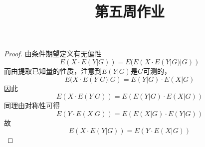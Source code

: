 \documentclass[cn]{homework}
\title{第五周作业}
\begin{document}
    \maketitle

    \problem
    \begin{proof}
        由条件期望定义有无偏性
        \[E(X\cdot E(Y|G))=E(E(X\cdot E(Y|G)|G))\]
        而由提取已知量的性质，注意到$E(Y|G)$是$G$可测的，
        \[E(X\cdot E(Y|G)|G)=E(Y|G)\cdot E(X|G)\]
        因此
        \[E(X\cdot E(Y|G))=E(E(Y|G)\cdot E(X|G))\]
        同理由对称性可得
        \[E(Y\cdot E(X|G))=E(E(X|G)\cdot E(Y|G))\]
        故
        \[E(X\cdot E(Y|G))=E(Y\cdot E(X|G))\]
    \end{proof}
\end{document}
